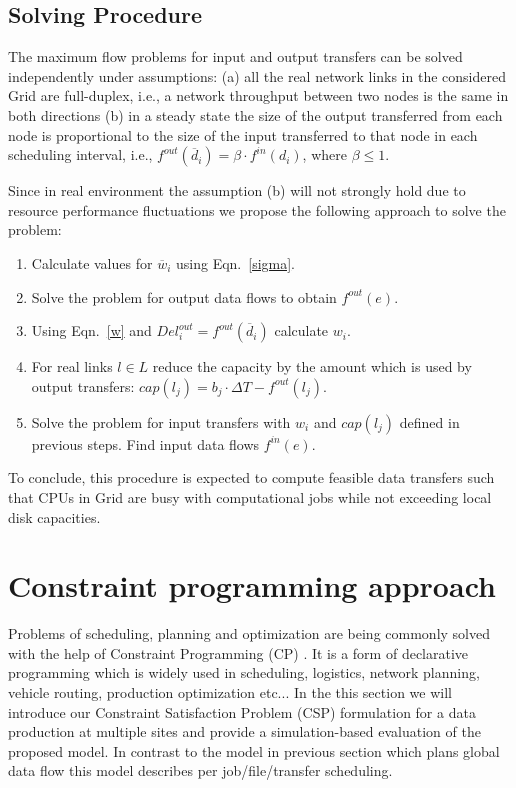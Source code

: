 \documentclass[english]{ddny}
\begin{document}
\subsection{Solving Procedure}
\label{solve}
The maximum flow problems for input and output transfers
can be solved independently under assumptions: (a) all the real network links
in the considered Grid are full-duplex, i.e., a network throughput between two
nodes is the same in both directions (b) in a steady state the size of the
output transferred from each node is proportional to the size of the input
transferred to that node in each scheduling interval, i.e.,
$f^{out}(\overline{d}_{i})= \beta \cdot f^{in}(d_{i})$, where $\beta \leq 1$.

Since in real environment the assumption (b) will not strongly hold due to
resource performance fluctuations we propose the following approach to
solve the problem:
%
\begin{enumerate}
\item Calculate values for $\overline{w}_{i}$ using Eqn.~\ref{sigma}.
\item Solve the problem for output data flows to obtain $f^{out}(e)$.
\item Using Eqn.~\ref{w} and $Del_{i}^{out} = f^{out}(\overline{d}_{i})$ calculate $w_{i}$.
\item For real links $l \in L$ reduce the capacity by the amount which is used by output transfers: $cap(l_{j}) = b_{j} \cdot \Delta T - f^{out}(l_{j})$.
\item Solve the problem for input transfers with $w_{i}$ and $cap(l_{j})$ defined in previous steps. Find input data flows $f^{in}(e)$.
\end{enumerate}
%
To conclude, this procedure is expected to compute feasible data transfers 
such that CPUs in Grid are busy with computational jobs while not exceeding 
local disk capacities.

\section{Constraint programming approach}
\label{CP_approach}
Problems of scheduling, planning and optimization are being commonly solved with the help of Constraint Programming (CP) \cite{CP}. It is a form of declarative programming which is widely used in scheduling, logistics, network planning, vehicle routing, production optimization etc... In the this section we will introduce our Constraint Satisfaction Problem (CSP) formulation for a data production at multiple sites and provide a simulation-based evaluation of the proposed model. In contrast to the model in previous section which plans global data flow this model describes per job/file/transfer scheduling. 
\end{document}
